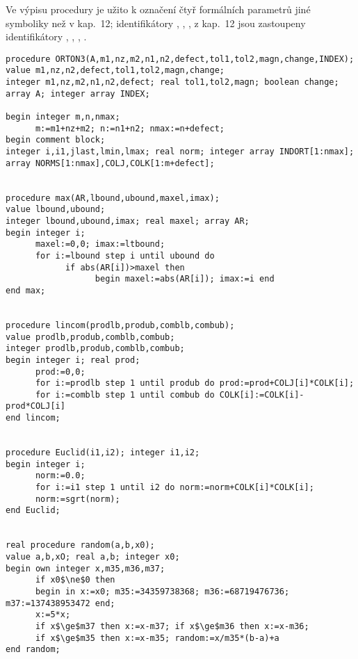 Ve výpisu procedury je užito k označení čtyř formálních
parametrů jiné symboliky než v kap.~12; identifikátory
, , ,  z kap.~12 jsou zastoupeny
identifikátory , , , .

%
%
\begin{lstlisting}[mathescape]
procedure ORTON3(A,m1,nz,m2,n1,n2,defect,tol1,tol2,magn,change,INDEX);
value m1,nz,n2,defect,tol1,tol2,magn,change;
integer m1,nz,m2,n1,n2,defect; real tol1,tol2,magn; boolean change;
array A; integer array INDEX;

begin integer m,n,nmax;
      m:=m1+nz+m2; n:=n1+n2; nmax:=n+defect;
begin comment block;
integer i,i1,jlast,lmin,lmax; real norm; integer array INDORT[1:nmax];
array NORMS[1:nmax],COLJ,COLK[1:m+defect];


procedure max(AR,lbound,ubound,maxel,imax);
value lbound,ubound;
integer lbound,ubound,imax; real maxel; array AR;
begin integer i;
      maxel:=0,0; imax:=ltbound;
      for i:=lbound step i until ubound do
            if abs(AR[i])>maxel then
                  begin maxel:=abs(AR[i]); imax:=i end
end max;


procedure lincom(prodlb,produb,comblb,combub);
value prodlb,produb,comblb,combub;
integer prodlb,produb,comblb,combub;
begin integer i; real prod;
      prod:=0,0;
      for i:=prodlb step 1 until produb do prod:=prod+COLJ[i]*COLK[i];
      for i:=comblb step 1 until combub do COLK[i]:=COLK[i]-prod*COLJ[i]
end lincom;


procedure Euclid(i1,i2); integer i1,i2;
begin integer i;
      norm:=0.0;
      for i:=i1 step 1 until i2 do norm:=norm+COLK[i]*COLK[i];
      norm:=sgrt(norm);
end Euclid;


real procedure random(a,b,x0);
value a,b,xO; real a,b; integer x0;
begin own integer x,m35,m36,m37;
      if x0$\ne$0 then
      begin in x:=x0; m35:=34359738368; m36:=68719476736; m37:=137438953472 end;
      x:=5*x;
      if x$\ge$m37 then x:=x-m37; if x$\ge$m36 then x:=x-m36;
      if x$\ge$m35 then x:=x-m35; random:=x/m35*(b-a)+a
end random;
\end{lstlisting}

